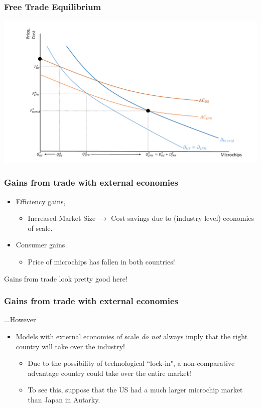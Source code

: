 \documentclass{beamer}
\begin{document}
\begin{frame}
	\frametitle{Free Trade Equilibrium}
	\includegraphics[scale=0.32]{SL4_19.pdf}
\end{frame}

\begin{frame}
	\frametitle{Gains from trade with external economies}
	\begin{itemize}
		\item Efficiency gains, 
			\begin{itemize}
				\item Increased Market Size $\rightarrow$ Cost savings due to (industry level) economies of scale.
			\end{itemize}
			
		\item  Consumer gains
			\begin{itemize}
				\item Price of microchips has fallen in both countries!
			\end{itemize}
	\end{itemize}
	Gains from trade look pretty good here!
\end{frame}

\begin{frame}
	\frametitle{Gains from trade with external economies}
...However
\begin{itemize}
	\item Models with external economies of scale \emph{do not} always imply that the right country will take over the industry!
		\begin{itemize}
			\item Due to the possibility of technological ``lock-in", a non-comparative advantage country could take over the entire market!
			\item To see this, suppose that the US had a much larger microchip market than Japan in Autarky.
		\end{itemize}
\end{itemize}
\end{frame}
\end{document}

